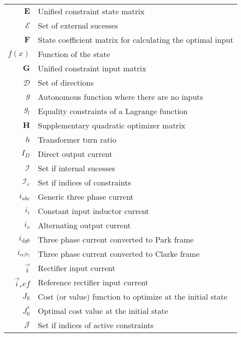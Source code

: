 \begin{scriptsize}
\begin{tabularx}{\textwidth}{r|X}
$\textbf{E}$                & Unified constraint state matrix \\
$\mathcal{E}$               & Set of external sucesses\\

$\textbf{F}$                & State coefficient matrix for calculating the optimal input \\
$f(x)$														& Function of the state\\

$\textbf{G}$                & Unified constraint input matrix \\
$\mathcal{D}$               & Set of directions\\
$g$                         & Autonomous function where there are no inputs\\
$g_l$                       & Equality constraints of a Lagrange function\\

$\textbf{H}$                & Supplementary quadratic optimizer matrix\\
$h$                                                             & Transformer turn ratio\\

$I_D$															& Direct output current\\
$\mathcal{I}$               & Set if internal sucesses\\
$\mathcal{I}_c$               & Set if indices of constraints\\
$i_{abc}$                   & Generic three phase current\\
$i_i$															& Constant input inductor current\\
$i_o$															& Alternating output current\\
$i_{dq0}$                   & Three phase current converted to Park frame\\
$i_{\alpha\beta\gamma}$                   & Three phase current converted to Clarke frame\\
$\vec{i}$													& Rectifier input current\\
$\vec{i}_ref$											& Reference rectifier input current\\


$J_0$                           & Cost (or value) function to optimize at the initial state\\
$J^*_0$            & Optimal cost value at the initial state\\
$\mathcal{J}$               & Set if indices of active constraints\\


\end{tabularx}
\end{scriptsize}
